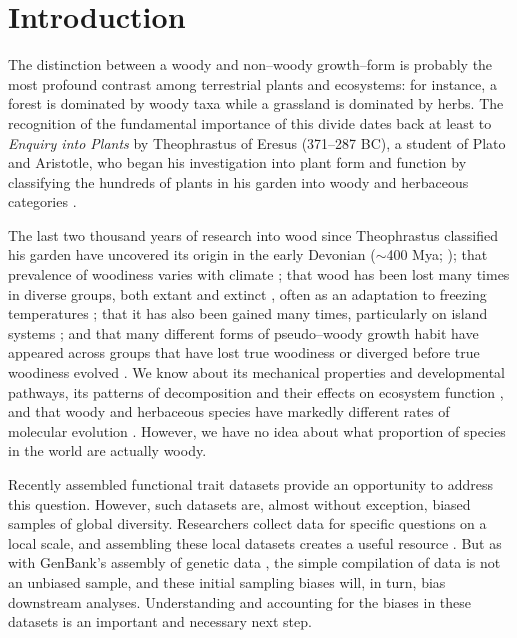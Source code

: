 \documentclass[a4paper,12pt]{article}
\begin{document}
\newpage
\doublespacing
\section{Introduction}

The distinction between a woody and non--woody growth--form is
probably the most profound contrast among terrestrial plants and
ecosystems: for instance, a forest is dominated by woody taxa 
while a grassland is dominated by herbs.  The recognition of the fundamental
importance of this divide dates back at least to \textit{Enquiry into
  Plants} by Theophrastus of Eresus (371--287 BC), a student of
Plato and Aristotle, who began his investigation into plant form and
function by classifying the hundreds of plants in his garden into
woody and herbaceous categories \citep{theophrastus1916enquiry}.

The last two thousand years of research into wood since Theophrastus
classified his garden have uncovered its origin in the early Devonian
($\sim$400 Mya; \citealt{gerrienne2011simple}); that prevalence of
woodiness varies with climate \citep{Molesheihgt}; that wood has been
lost many times in diverse groups, both extant and extinct
\citep{judd1994}, often as an adaptation to freezing temperatures
\citep{Zanne}; that it has also been gained many times,
particularly on island systems \citep{Carlquist1974,Givnish1998};
and that many different forms of pseudo--woody growth
habit have appeared across groups that have lost true woodiness or
diverged before true woodiness evolved \citep{Cornwellwood}.  We know
about its mechanical properties and developmental pathways, its
patterns of decomposition and their effects on ecosystem function
\citep{Cornwellwood}, and that woody and herbaceous species have
markedly different rates of molecular evolution \citep{SmithDonoghue}.
%
However, we have no idea about what proportion of species in the world
are actually woody.

Recently assembled functional trait datasets provide an opportunity to
address this question. However, such datasets are, almost without
exception, biased samples of global diversity.  Researchers collect
data for specific questions on a local scale, and assembling these
local datasets creates a useful resource \citep{kattge2011try}.  But
as with GenBank's assembly of genetic data
\citep{smith2011understanding}, the simple compilation of data is not
an unbiased sample, and these initial sampling biases will, in turn,
bias downstream analyses.  Understanding and accounting for the biases
in these datasets is an important and necessary next step.
\end{document}
